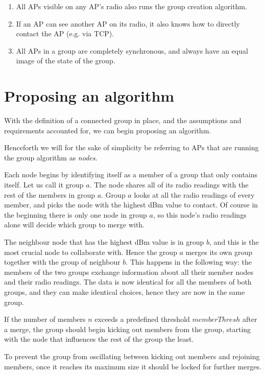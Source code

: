     \begin{enumerate}
    \item All APs visible on any AP's radio also runs the group creation algorithm.
    \item If an AP can see another AP on its radio, it also knows how to directly contact the AP (e.g. via TCP).
    \item All APs in a group are completely synchronous, and always have an equal image of the state of the group. 
    \end{enumerate}

\section{Proposing an algorithm}\label{algorithm}
With the definition of a connected group in place, and the assumptions and requirements accounted for, we can begin proposing an algorithm.

Henceforth we will for the sake of simplicity be referring to APs that are running the group algorithm as \textit{nodes}.

Each node begins by identifying itself as a member of a group that only contains itself. Let us call it group $a$. The node shares all of
its radio readings with the rest of the members in group $a$. Group $a$ looks at all the radio readings of every member, and picks the node with the highest dBm value
to contact. Of course in the beginning there is only one node in group $a$, so this node's radio readings alone will decide which group to merge with. 

The neighbour node that has the highest dBm value is in group $b$, and this is the most crucial node to collaborate with. Hence the group $a$ merges its own group together
with the group of neighbour $b$. This happens in the following way: the members of the two groups exchange information about all their member nodes and their radio readings.
The data is now identical for all the members of both groups, and they can make identical choices, hence they are now in the same group. 

If the number of members $n$ exceeds a predefined threshold $memberThresh$ after a merge, the group should begin kicking out members from the group, starting with the node
that influences the rest of the group the least. 

To prevent the group from oscillating between kicking out members and rejoining members, once it reaches
its maximum size it should be locked for further merges. 


